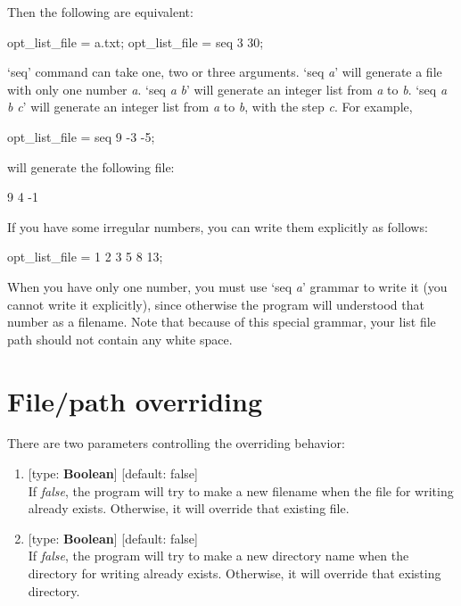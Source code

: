 \documentclass[11pt]{book}
\begin{document}
Then the following are equivalent:

\begin{everbatim}
opt_list_file = a.txt;
opt_list_file = seq 3 30;
\end{everbatim}

`seq' command can take one, two or three arguments. `seq \emph{a}' will generate a file with only one number \emph{a}. 
`seq \emph{a} \emph{b}' will generate an integer list from \emph{a} to \emph{b}. `seq \emph{a} \emph{b} \emph{c}' will 
generate an integer list from \emph{a} to \emph{b}, with the step \emph{c}. For example, 

\begin{everbatim}
opt_list_file = seq 9 -3 -5;
\end{everbatim}

will generate the following file:

\begin{everbatim}
9
4
-1
\end{everbatim}

If you have some irregular numbers, you can write them explicitly as follows:

\begin{everbatim}
opt_list_file = 1 2 3 5 8 13;
\end{everbatim}

When you have only one number, you must use `seq \emph{a}' grammar to write it (you cannot write it explicitly), 
since otherwise the program will understood that 
number as a filename. Note that because of this special grammar, your list file path should not contain any white space.

\section{File/path overriding} \label{ptov}

There are two parameters controlling the overriding behavior:

\begin{enumerate}
\item {} [type: \textbf{Boolean}] [default: false] \\
	If \emph{false}, the program will try to make a new filename when the file for writing already exists. Otherwise, 
	it will override that existing file.
\item {} [type: \textbf{Boolean}] [default: false] \\
	If \emph{false}, the program will try to make a new directory name when the directory for writing already exists. Otherwise, 
	it will override that existing directory.
\end{enumerate}
\end{document}
